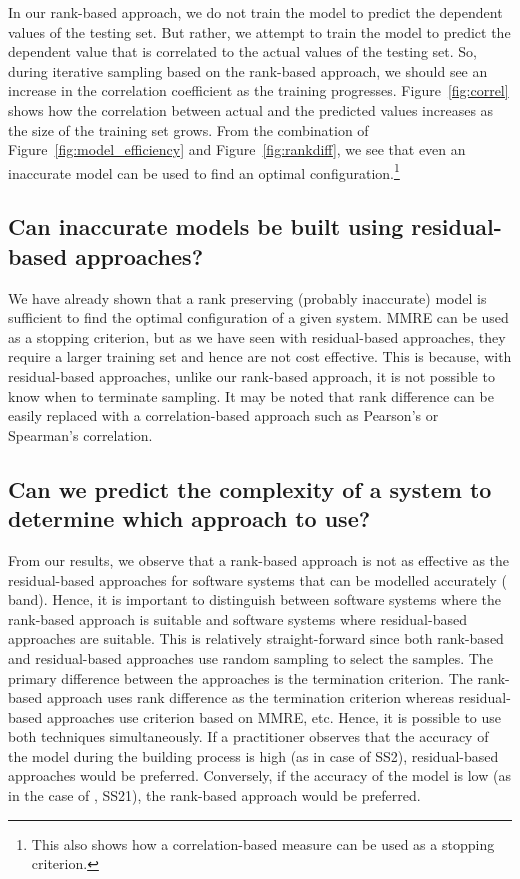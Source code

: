 In our rank-based approach, we do not train the model to predict the dependent values of the testing set. But rather, we attempt to train the model to predict the dependent value that is correlated to the actual values of the testing set. So, during iterative sampling based on the rank-based approach, we should see an increase in the correlation coefficient as the training progresses. Figure~\ref{fig:correl} shows how the correlation between actual and the predicted values increases as the size of the training set grows. From the combination of Figure~\ref{fig:model_efficiency} and Figure~\ref{fig:rankdiff}, we see that even an inaccurate model can be used to find an optimal configuration.\footnote{This also shows how a correlation-based measure can be used as a stopping criterion.}


\subsection{Can inaccurate models be built using residual-based approaches?}
We have already shown that a rank preserving (probably inaccurate) model is sufficient to find the optimal configuration of a given system. MMRE can be used as a stopping criterion, but as we have seen with residual-based approaches, they require a larger training set and hence are not cost effective. This is because, with residual-based approaches, unlike our rank-based approach, it is not possible to know when to terminate sampling. 
It may be noted that rank difference can be easily replaced with a correlation-based approach such as Pearson's or Spearman's correlation.


\subsection{Can we predict the complexity of a system to determine which approach to use?}
From our results, we observe that a rank-based approach is not as effective as the residual-based approaches for software systems that can be modelled accurately ( band). Hence, it is important to distinguish between software systems where the rank-based approach is suitable and software systems where residual-based approaches are suitable. This is relatively straight-forward since both rank-based and residual-based approaches use random sampling to select the samples. The primary difference between the approaches is the termination criterion. The rank-based approach uses rank difference as the termination criterion whereas residual-based approaches use criterion based on MMRE, etc. Hence, it is possible to use both techniques simultaneously. If a practitioner observes that the accuracy of the model during the building process is high (as in case of SS2), residual-based approaches would be preferred. Conversely, if the accuracy of the model is low (as in the case of 
, SS21), the rank-based approach would be preferred.


